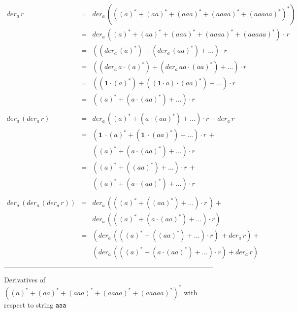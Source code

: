 \documentclass[12pt]{article}
\newcommand{\ONE}{\textbf{1}}
\newcommand{\der}{\textit{der}}
\begin{document}
\begin{figure}[ht]
  \begin{center}
    \[
    \begin{array}{rcl}
      \der_a\, r          & =           &  \der_a\,( ((a)^* + (aa)^* + (aaa)^* + (aaaa)^* + (aaaaa)^* )^*) \\
                          & =           & \der_a\, ((a)^* + (aa)^* + (aaa)^* + (aaaa)^* + (aaaaa)^* ) \cdot \, r \\  
                          & =           & ((\der_a\, (a)^*) + (\der_a\, (aa)^*)+ \dots ) \cdot  r \\
                          & =           & ((\der_a\, a \cdot (a)^*) + (\der_a\,aa \cdot (aa)^*)+ \dots ) \cdot  r \\
                          & =           & ((\ONE \cdot (a)^*) + ((\ONE \cdot a) \cdot (aa)^*)+ \dots ) \cdot  r\\
                          & =           & ((a)^* + (a \cdot (aa)^*)+ \dots ) \cdot  r \\\\

      \der_a\, (\der_a\, r) & =           & \der_a\, ((a)^* + (a \cdot (aa)^*)+ \dots ) \cdot r + \der_a\,r \\
                            & =           & (\ONE\ \cdot (a)^* + (\ONE\ \cdot (aa)^*)+ \dots ) \cdot r \,+ \\
                            &             &  ((a)^* + (a \cdot (aa)^*)+ \dots ) \cdot  r \\
                             
                            & =           & ((a)^* + ((aa)^*)+ \dots ) \cdot r \,+ \\
                            &             &  ((a)^* + (a \cdot (aa)^*)+ \dots ) \cdot  r \\\\ 
                            
                        
     \der_a\,( \der_a\, (\der_a\, r)) & =           & \der_a\, (((a)^* + ((aa)^*)+ \dots ) \cdot r \,)+ \\
                            &             &  \der_a\,(((a)^* + (a \cdot (aa)^*)+ \dots ) \cdot  r )  \\
                            & =           & (\der_a\, (((a)^* + ((aa)^*)+ \dots ) \cdot r) \, + \der_a\, r )+\\
                            &             & ( \der_a\,(((a)^* + (a \cdot (aa)^*)+ \dots ) \cdot  r) + der_a\, r)                     
            \end{array}
    \]
    \mbox{}
    \rule{\linewidth}{0.4pt}
\caption{Derivatives of $((a)^* + (aa)^* + (aaa)^* + (aaaa)^* + (aaaaa)^* )^*$ with respect to string \texttt{aaa}}\label{derivativeStarsExample}
  \end{center}
\end{figure}
\end{document}
